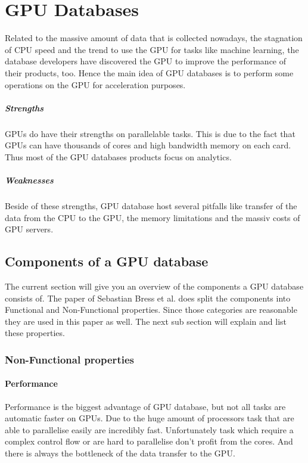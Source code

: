 \chapter{GPU Databases}
Related to the massive amount of data that is collected nowadays, the stagnation of CPU speed
and the trend to use the GPU for tasks like machine learning, the database developers have discovered the GPU to improve the performance of their products, too.
Hence the main idea of GPU databases is to perform some operations on the GPU for acceleration purposes.

\paragraph{Strengths}
GPUs do have their strengths on parallelable tasks.
This is due to the fact that GPUs can have thousands of cores and high bandwidth memory on each card.
Thus most of the GPU databases products focus on analytics.


\paragraph{Weaknesses} Beside of these strengths, GPU database host several pitfalls like transfer of the data from the CPU to the GPU,
 the memory limitations and the massiv costs of GPU servers.


\section{Components of a GPU database}
The current section will give you an overview of the components a GPU database consists of.
The paper \cite{bress2014gpu} of Sebastian Bress et al. does split the components into Functional and Non-Functional properties.
Since those categories are reasonable they are used in this paper as well.
The next sub section will explain and list these properties.

\subsection{Non-Functional properties}

\subsubsection{Performance}
Performance is the biggest advantage of GPU database, but not all tasks are automatic faster on GPUs.
Due to the huge amount of processors task that are able to parallelise easily are incredibly fast.
Unfortunately task which require a complex control flow or are hard to parallelise don't profit from the cores.
And there is always the bottleneck of the data transfer to the GPU.

